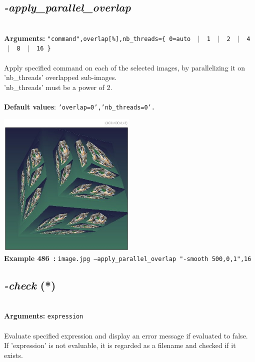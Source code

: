 \documentclass[a4paper,11pt,twoside]{book}
\begin{document}
\subsection{\emph{-apply\_parallel\_overlap} }\vspace*{-0.5em}
~\\\textbf{Arguments: } 
{\small \texttt{"command",overlap[\%],nb\_threads=\{ 0=auto ~$|$~ 1 ~$|$~ 2 ~$|$~ 4 ~$|$~ 8 ~$|$~ 16 \}}}\\~\\
Apply specified command on each of the selected images, by parallelizing it on 'nb\_threads' overlapped sub-images.
~\\'nb\_threads' must be a power of 2.
~\\~\\\textbf{Default values}: {\small \texttt{'overlap=0','nb\_threads=0'.}}
\begin{center}\includegraphics[keepaspectratio=true,height=7cm,width=\textwidth]{img/gmic_def486.jpg}\\
{\footnotesize \textbf{Example 486~:} \texttt{image.jpg --apply\_parallel\_overlap "-smooth 500,0,1",16}}
\end{center}

\subsection{\emph{-check} (*)}\vspace*{-0.5em}
~\\\textbf{Arguments: } 
{\small \texttt{expression}}\\~\\
Evaluate specified expression and display an error message if evaluated to false.
~\\If 'expression' is not evaluable, it is regarded as a filename and checked if it exists.
\end{document}
